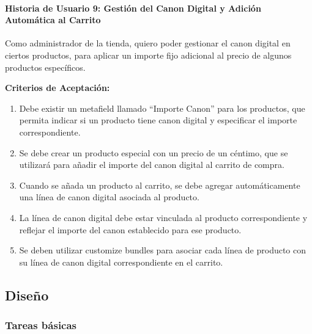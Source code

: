 \documentclass[12pt]{article}
\newcommand{\subsubsubsection}[1]{\paragraph{#1}}
\begin{document}
\subsubsubsection{Historia de Usuario 9: Gestión del Canon Digital y Adición Automática al Carrito}\label{sec:historia9}

Como administrador de la tienda,
quiero poder gestionar el canon digital en ciertos productos,
para aplicar un importe fijo adicional al precio de algunos productos específicos.

\vspace{0.5cm}
\textbf{Criterios de Aceptación:}
\begin{enumerate}[label=\arabic*.]
    \item Debe existir un metafield llamado ``Importe Canon'' para los productos, que permita indicar si un producto tiene canon digital y especificar el importe correspondiente.
    \item Se debe crear un producto especial con un precio de un céntimo, que se utilizará para añadir el importe del canon digital al carrito de compra.
    \item Cuando se añada un producto al carrito, se debe agregar automáticamente una línea de canon digital asociada al producto.
    \item La línea de canon digital debe estar vinculada al producto correspondiente y reflejar el importe del canon establecido para ese producto.
    \item Se deben utilizar customize bundles para asociar cada línea de producto con su línea de canon digital correspondiente en el carrito.
\end{enumerate}

\subsection{Diseño}

\subsubsection{Tareas básicas}
\end{document}
